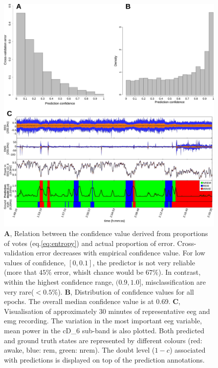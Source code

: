 \begin{figure}[h!]
  \centering    
    \includegraphics[width=1.0\textwidth]{figures/error.pdf}
    \caption{
    \textbf{A}, Relation between the confidence value derived from proportions of votes (eq.\ref{eq:entropy}) and actual proportion of error.
    Cross-validation error decreases with empirical confidence value.
    For low values of confidence, $[0, 0.1]$, the predictor is not very 
    reliable (more that $45\%$ error, whislt chance would be $67\%$).
    In contrast, within the highest confidence range, $(0.9, 1.0]$, misclassification are very rare($<0.5 \%$).
    \textbf{B}, Distribution of confidence values for all epochs. The overall median confidence value is at 0.69.
    \textbf{C}, Visualisation of approximately 30 minutes of representative \gls{eeg} and \gls{emg} recording.
    The variation in the most important \gls{eeg} variable, mean power in the cD\_6 sub-band is also plotted.
    Both predicted and ground truth states are represented by different colours (red: awake, blue: \gls{rem}, green: \gls{nrem}).
    The doubt level ($1 - c$) associated with predictions is displayed on top of the prediction annotations.
    \label{fig:error}
  }
\end{figure}
